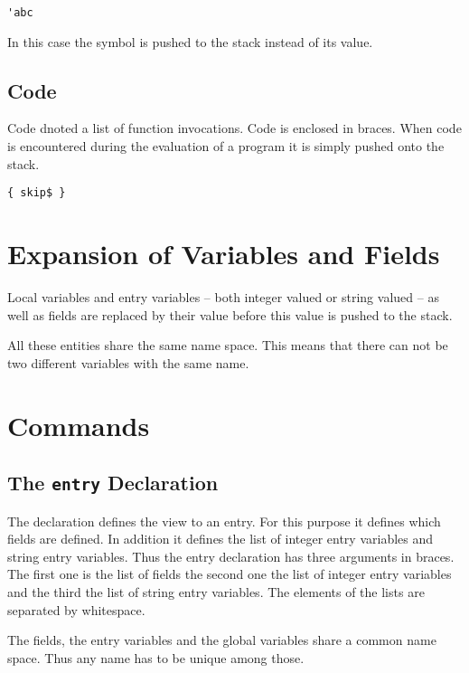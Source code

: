 \begin{lstlisting}[language=bst]
  'abc
\end{lstlisting}

In this case the symbol is pushed to the stack instead of its value.

\subsection{Code}\label{sec:bst.code}

Code dnoted a list of function invocations. Code is enclosed in
braces. When code is encountered during the evaluation of a program it
is simply pushed onto the stack.

\begin{lstlisting}[language=bst]
  { skip$ }
\end{lstlisting}

\section{Expansion of Variables and Fields}

Local variables and entry variables -- both integer valued or string
valued -- as well as fields are replaced by their value before this
value is pushed to the stack.

All these entities share the same name space. This means that there
can not be two different variables with the same name.


\section{Commands}

\subsection{The \texttt{entry} Declaration}%
%
\label{sec:entry}

The declaration defines the view to an entry. For this purpose it
defines which fields are defined. In addition it defines the list of
integer entry variables and string entry variables. Thus the entry
declaration has three arguments in braces. The first one is the list
of fields the second one the list of integer entry variables and the
third the list of string entry variables. The elements of the lists
are separated by whitespace.

The fields, the entry variables and the global variables share a
common name space. Thus any name has to be unique among those.

